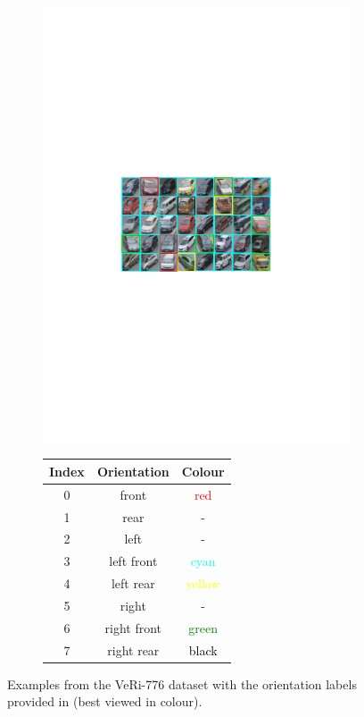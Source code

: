 \documentclass[10pt,twocolumn,letterpaper]{article}
\begin{document}
\begin{figure}[t]
  \begin{subfigure}{.6\textwidth}
    \includegraphics[width=\linewidth,trim=5cm 11cm 5cm 11cm,clip=true]{images/veri_orients.pdf}
  \end{subfigure}
  \begin{subfigure}{.4\textwidth}
    \centering
    \begin{tabular}{c | c | c}
      \hline
      Index & Orientation & Colour \\
      \hline
      0 & front & \textcolor{red}{red} \\
      1 & rear & - \\
      2 & left  & - \\
      3 & left front & \textcolor{cyan}{cyan}  \\
      4 & left rear & \textcolor{yellow}{yellow}  \\
      5 & right  & - \\
      6 & right front & \textcolor{green}{green} \\
      7 & right rear & \textcolor{black}{black} \\
      \hline
    \end{tabular}
  \end{subfigure}
  \caption{Examples from the VeRi-776 dataset with the orientation labels provided in \cite{wang2017orientation} (best viewed in colour).}
  \label{F:veri_veh_orientations}
\end{figure}
\end{document}
